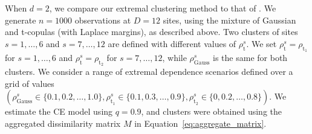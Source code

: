 \documentclass[12pt,compact]{article}
\newcommand{\JSGa}{\mathop{\mathrm{JS}^{\mathrm{G}_{\lambda}}}\nolimits}
\newcommand{\rhou}[1]{\rho_{\text{#1}}}
\begin{document}
When $d = 2$, we compare our extremal clustering method to that of \citet{Vignotto2021}.
We generate $n = 1000$ observations at $D = 12$ sites, using the mixture of Gaussian and t-copulas (with Laplace margins), as described above. 
Two clusters of sites $s = {1, \ldots, 6}$ and $s = {7, \ldots, 12}$ are defined with different values of $\rhou{t}^s$. 
We set $\rhou{t}^s = \rho_{\text{t}_1}$ for $s = 1, \ldots, 6$ and $\rhou{t}^s = \rho_{\text{t}_2}$ for $s = 7, \ldots, 12$, while $\rhou{Gauss}^s$ is the same for both clusters. 
We consider a range of extremal dependence scenarios defined over a grid of values $\left(\rhou{Gauss}^s \in \{0.1, 0.2, \ldots, 1.0\}, \rho_{\text{t}_1}^s \in \{0.1, 0.3, \ldots, 0.9\}, \rho_{\text{t}_2}^s \in \{0, 0.2, \ldots, 0.8\}\right)$.
We estimate the CE model using $q = 0.9$, and clusters were obtained using the aggregated dissimilarity matrix $M$ in Equation~\eqref{eq:aggregate_matrix}.
\end{document}
